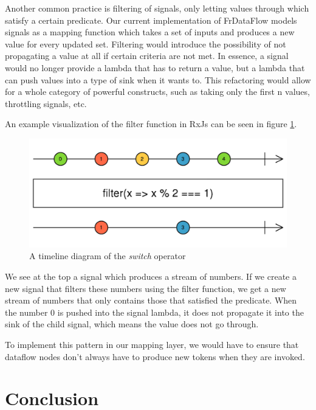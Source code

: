 Another common practice is filtering of signals, only letting values through which satisfy a certain predicate. Our current implementation of FrDataFlow models signals as a mapping function which takes a set of inputs and produces a new value for every updated set. Filtering would introduce the possibility of not propagating a value at all if certain criteria are not met. In essence, a signal would no longer provide a lambda that has to return a value, but a lambda that can push values into a type of sink when it wants to. This refactoring would allow for a whole category of powerful constructs, such as taking only the first n values, throttling signals, etc. 

An example visualization of the filter function in RxJs can be seen in figure  \ref{fig:futurework-filtering-filter}. 

\begin{figure}[h!]
	\includegraphics[width=\textwidth]{images/FutureWork-Filtering-Filter.png}
	\caption{A timeline diagram of the \textit{switch} operator}
	\label{fig:futurework-filtering-filter}
\end{figure}

We see at the top a signal which produces a stream of numbers. If we create a new signal that filters these numbers using the filter function, we get a new stream of numbers that only contains those that satisfied the predicate. When the number 0 is pushed into the signal lambda, it does not propagate it into the sink of the child signal, which means the value does not go through. 

To implement this pattern in our mapping layer, we would have to ensure that dataflow nodes don't always have to produce new tokens when they are invoked. 


\section{Conclusion}



